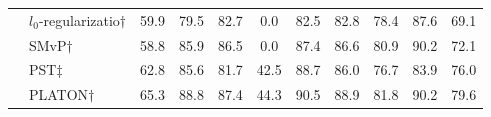 \begin{table}[t]
\begin{tabular}{c|l|cccccccc|c}
		&$l_0$-regularizatio$\dagger$                                                 &59.9                                                                                        &  79.5                                                                               &  82.7     & 0.0                                                                                        &    82.5                                                                                      &   82.8                                                                                      &    78.4                                                                                     &   87.6                                                                           &69.1          \\
		&SMvP$\dagger$                                                 &58.8                                                                                        &   85.9                                                                                &86.5     &  0.0                                                                                       &   87.4                                                                                       &  86.6                                                                                       &  80.9                                                                                       &    90.2                                                                        &  72.1          \\
		&PST$\ddagger$                                             &62.8                                                                                        &  85.6                                                                             &81.7         & 42.5                                                                                        & 88.7                                                                                         &   86.0                                                                                      &    76.7                                                                                     & 83.9                                                                              & 76.0        \\
		& PLATON$\dagger$                                                &  65.3                                                                                      & 88.8                                                                               &87.4        &44.3                                                                                         &  90.5                                                                                        &88.9                                                                                         &  81.8                                                                                       &  90.2                                                                              &   79.6     \\

\end{tabular}
\end{table}
